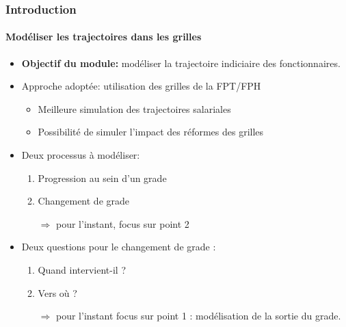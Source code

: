 \documentclass[xcolor=table,ignorenonframetext,12pt]{beamer}
\newenvironment{choixmarges}[2]{\begin{list}{}{%
\setlength{\topsep}{0pt}%
\setlength{\leftmargin}{0pt}%
\setlength{\rightmargin}{0pt}%
\setlength{\listparindent}{\parindent}%
\setlength{\itemindent}{\parindent}%
\setlength{\parsep}{0pt plus 1pt}%
\addtolength{\leftmargin}{#1}%
\addtolength{\rightmargin}{#2}%
}\item }{\end{list}}
\begin{document}
\begin{frame}
\frametitle{Introduction}
\framesubtitle{Modéliser les trajectoires dans les grilles}

\begin{choixmarges}{-0.5cm}{-0.5cm}
\begin{itemize}
\item \textbf{Objectif du module:} modéliser la trajectoire indiciaire des fonctionnaires.
\vspace{0.1cm}

\item Approche adoptée: utilisation des grilles de la FPT/FPH
	\begin{itemize}
	\item Meilleure simulation des trajectoires salariales
	\item Possibilité de simuler l'impact des réformes des grilles
	\end{itemize}

\vspace{0.1cm}
\item Deux processus à modéliser: 
	\begin{enumerate}
	\item Progression au sein d'un grade \\
	\item Changement de grade
	\item[$\Rightarrow$] pour l'instant, focus sur point 2
	\end{enumerate}

\vspace{0.1cm}
\item Deux questions pour le changement de grade : 
	\begin{enumerate}
	\item Quand intervient-il ? 
	\item Vers où ? 
	\item[$\Rightarrow$]  pour l'instant focus sur point 1 : modélisation de la sortie du grade. 
	\end{enumerate}
\end{itemize}

\end{choixmarges}
\end{frame}
\end{document}
